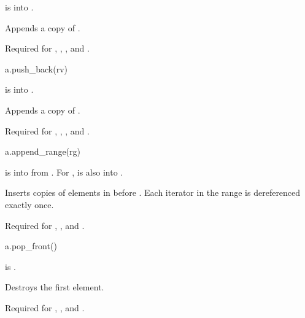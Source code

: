 \begin{itemdescr}
\pnum
\result
{}

\pnum
\expects
{} is  into .

\pnum
\effects
Appends a copy of .

\pnum
\remarks
Required for
,
,
, and
.
\end{itemdescr}

\begin{itemdecl}
a.push_back(rv)
\end{itemdecl}

\begin{itemdescr}
\pnum
\result
{}

\pnum
\expects
{} is  into .

\pnum
\effects
Appends a copy of .

\pnum
\remarks
Required for
,
,
, and
.
\end{itemdescr}

\begin{itemdecl}
a.append_range(rg)
\end{itemdecl}

\begin{itemdescr}
\pnum
\result
{}

\pnum
\expects
{} is  into 
from .
For ,
 is also
 into .

\pnum
\effects
Inserts copies of elements in  before .
Each iterator in the range  is dereferenced exactly once.

\pnum
\remarks
Required for
,
, and
.
\end{itemdescr}

\begin{itemdecl}
a.pop_front()
\end{itemdecl}

\begin{itemdescr}
\pnum
\result
{}

\pnum
\expects
{} is .

\pnum
\effects
Destroys the first element.

\pnum
\remarks
Required for
,
, and
.
\end{itemdescr}

